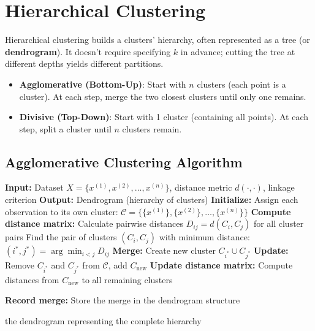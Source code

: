 \section{Hierarchical Clustering}

Hierarchical clustering builds a clusters' hierarchy, often represented as a tree (or \textbf{dendrogram}). It doesn't require specifying $k$ in advance; cutting the tree at different depths yields different partitions.

\begin{definitionblock}
\begin{itemize}
    \item \textbf{Agglomerative (Bottom-Up)}: Start with $n$ clusters (each point is a cluster). At each step, merge the two closest clusters until only one remains.
    \item \textbf{Divisive (Top-Down)}: Start with 1 cluster (containing all points). At each step, split a cluster until $n$ clusters remain.
\end{itemize}
\end{definitionblock}

\subsection{Agglomerative Clustering Algorithm}

\begin{algorithm}[H]
    \caption{Agglomerative Hierarchical Clustering}
    \begin{algorithmic}[1]
        \State \textbf{Input:} Dataset $X = \{x^{(1)}, x^{(2)}, \dots, x^{(n)}\}$, distance metric $d(\cdot, \cdot)$, linkage criterion
        \State \textbf{Output:} Dendrogram (hierarchy of clusters)
        \State \textbf{Initialize:} Assign each observation to its own cluster: $\mathcal{C} = \{\{x^{(1)}\}, \{x^{(2)}\}, \dots, \{x^{(n)}\}\}$
        \State \textbf{Compute distance matrix:} Calculate pairwise distances $D_{ij} = d(C_i, C_j)$ for all cluster pairs
            \State Find the pair of clusters $(C_i, C_j)$ with minimum distance:  $(i^*, j^*) = \arg \min_{i < j} D_{ij}$
            \State \textbf{Merge:} Create new cluster $C_{i^*} \cup C_{j^*}$
            \State \textbf{Update:} Remove $C_{i^*}$ and $C_{j^*}$ from $\mathcal{C}$, add $C_{\text{new}}$
            \State \textbf{Update distance matrix:} Compute distances from $C_{\text{new}}$ to all remaining clusters

            \State \textbf{Record merge:} Store the merge in the dendrogram structure
        \EndWhile

        \State \Return the dendrogram representing the complete hierarchy
    \end{algorithmic}
\end{algorithm}

